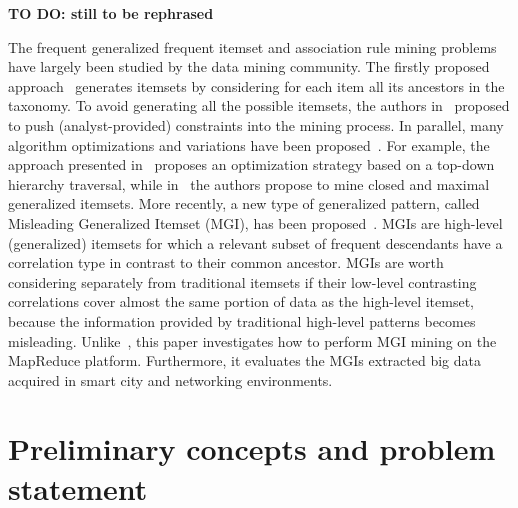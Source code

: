 \textbf{TO DO: still to be rephrased}

The frequent generalized frequent itemset and association rule mining problems~\cite{Srikant1995} have largely been studied by the data mining community.
The firstly proposed approach~\cite{Srikant1995} generates itemsets by considering for each item all its ancestors in the taxonomy. 
To avoid generating all the possible itemsets, the authors in~\cite{Sriphaew2002,BaralisCCG12} proposed to push (analyst-provided) constraints into the mining process.
In parallel, many algorithm optimizations and variations have been proposed~\cite{Han1999,KunkleZC08,ChangeTKDE}. 
For example, the approach presented in~\cite{Han1999} proposes an optimization strategy based on a top-down hierarchy traversal, while 
in~\cite{KunkleZC08} the authors propose to mine closed and maximal generalized itemsets. 
More recently, a new type of generalized pattern, called Misleading Generalized Itemset (MGI), has been proposed~\cite{MGI}. 
MGIs are high-level (generalized) itemsets for which a relevant subset of frequent descendants have a correlation type in contrast to their common ancestor. 
MGIs are worth considering separately from traditional itemsets if their low-level contrasting correlations cover almost the same portion of data as the high-level itemset, 
because the information provided by traditional high-level patterns becomes misleading. 
Unlike~\cite{MGI}, this paper investigates how to perform MGI mining on the MapReduce platform. 
Furthermore, it evaluates the MGIs extracted big data acquired in smart city and networking environments.


\section{Preliminary concepts and problem statement}
\label{probstat}

